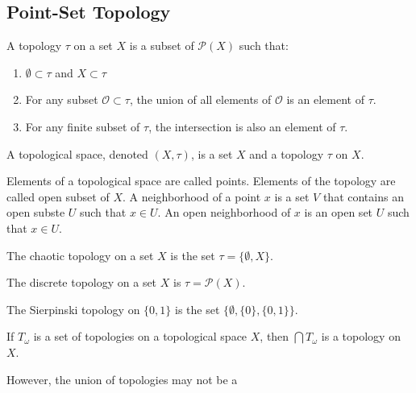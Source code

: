 \documentclass[crop=false,class=book,oneside]{standalone}
\begin{document}
    \subsection{Point-Set Topology}
        \begin{definition}
            A topology $\tau$ on a set $X$ is a subset
            of $\mathcal{P}(X)$ such that:
            \begin{enumerate}
                \item $\emptyset\subset\tau$ and $X\subset\tau$
                \item For any subset $\mathcal{O}\subset\tau$, the
                      union of all elements of $\mathcal{O}$ is an
                      element of $\tau$.
                \item For any finite subset of $\tau$, the intersection
                      is also an element of $\tau$.
            \end{enumerate}
        \end{definition}
        \begin{definition}
            A topological space, denoted $(X,\tau)$, is a set
            $X$ and a topology $\tau$ on $X$.
        \end{definition}
        Elements of a topological space are called points.
        Elements of the topology are called open subset of $X$.
        A neighborhood of a point $x$ is a set $V$ that contains
        an open subste $U$ such that $x\in{U}$. An open neighborhood
        of $x$ is an open set $U$ such that $x\in{U}$.
        \begin{example}
            The chaotic topology on a set
            $X$ is the set $\tau=\{\emptyset,X\}$.
        \end{example}
        \begin{example}
            The discrete topology on a set $X$ is
            $\tau=\mathcal{P}(X)$.
        \end{example}
        \begin{example}
            The Sierpinski topology
            on $\{0,1\}$ is the set
            $\{\emptyset,\{0\},\{0,1\}\}$.
        \end{example}
        \begin{theorem}
            If $T_{\omega}$ is a set of topologies on
            a topological space $X$, then
            $\bigcap{T_{\omega}}$ is a topology on $X$.
        \end{theorem}
        However, the union of topologies may not be a
\end{document}
